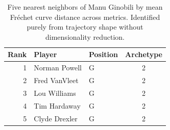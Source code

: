 \begin{table}[htbp]
  \centering\small
  \begin{tabular}{rllc}
    \toprule
    Rank & Player & Position & Archetype \\
    \midrule
    1 & Norman Powell & G & 2 \\
    2 & Fred VanVleet & G & 2 \\
    3 & Lou Williams & G & 2 \\
    4 & Tim Hardaway & G & 2 \\
    5 & Clyde Drexler & G & 2 \\
    \bottomrule
  \end{tabular}
  \caption{Five nearest neighbors of Manu Ginobili by mean Fr\'{e}chet curve distance across metrics. Identified purely from trajectory shape without dimensionality reduction.}
  \label{tab:Manu_Ginobili_frechet_curve_neighbors}
\end{table}

